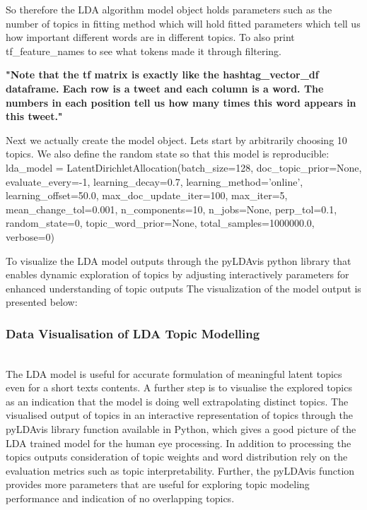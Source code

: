 So therefore the LDA algorithm model object holds parameters such as the number of topics  in fitting method which will hold fitted parameters which tell us how important different words are in different topics. To also print tf_feature_names to see what tokens made it through filtering.

\textbf{"Note that the tf matrix is exactly like the hashtag_vector_df dataframe. Each row is a tweet and each column is a word. The numbers in each position tell us how many times this word appears in this tweet."}

Next we actually create the model object. Lets start by arbitrarily choosing 10 topics. We also define the random state so that this model is reproducible: lda_model = 
LatentDirichletAllocation(batch_size=128,          doc_topic_prior=None,
evaluate_every=-1, learning_decay=0.7,
                          learning_method='online', learning_offset=50.0,
                          max_doc_update_iter=100, max_iter=5,
                          mean_change_tol=0.001, n_components=10, n_jobs=None,
                          perp_tol=0.1, random_state=0, topic_word_prior=None,
                          total_samples=1000000.0, verbose=0)

To visualize the LDA model outputs through the pyLDAvis python library that enables dynamic exploration of topics by adjusting interactively parameters for enhanced understanding of topic outputs   The visualization of the model output is presented below:

\subsubsection{Data Visualisation of LDA Topic Modelling}\\
The LDA model is useful for accurate formulation of meaningful latent topics even for a short texts contents.  A further step is to visualise the explored topics as an indication that the model is doing well extrapolating distinct topics.  The visualised output of topics in an interactive representation of topics through the pyLDAvis library function available in Python, which gives a good picture of the LDA trained model for the human eye processing.  In addition to processing the topics outputs consideration of topic weights and word distribution rely on the evaluation metrics such as topic interpretability.   Further, the pyLDAvis function provides more parameters that are useful for exploring topic modeling performance and indication of no overlapping topics.  

